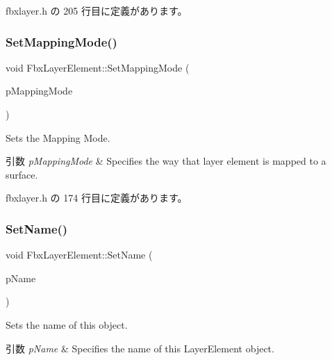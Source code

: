  fbxlayer.\+h の 205 行目に定義があります。

\mbox{\label{class_fbx_layer_element_af6918a0a87c5df4d257198d3c6a12ee2}} 
\subsubsection{\texorpdfstring{Set\+Mapping\+Mode()}{SetMappingMode()}}
{\footnotesize\ttfamily void Fbx\+Layer\+Element\+::\+Set\+Mapping\+Mode (\begin{DoxyParamCaption}\item[{\hyperlink{class_fbx_layer_element_a5a40e95db30ae9f94611dc3f1568af26}{E\+Mapping\+Mode}}]{p\+Mapping\+Mode }\end{DoxyParamCaption})\hspace{0.3cm}{\ttfamily [inline]}}

Sets the Mapping Mode. 
\begin{DoxyParams}{引数}
{\em p\+Mapping\+Mode} & Specifies the way that layer element is mapped to a surface. \\
\hline
\end{DoxyParams}


 fbxlayer.\+h の 174 行目に定義があります。

\mbox{\label{class_fbx_layer_element_a6b7d11d4cc2732537377f9483bac4d52}} 
\subsubsection{\texorpdfstring{Set\+Name()}{SetName()}}
{\footnotesize\ttfamily void Fbx\+Layer\+Element\+::\+Set\+Name (\begin{DoxyParamCaption}\item[{const char $\ast$}]{p\+Name }\end{DoxyParamCaption})\hspace{0.3cm}{\ttfamily [inline]}}

Sets the name of this object. 
\begin{DoxyParams}{引数}
{\em p\+Name} & Specifies the name of this Layer\+Element object. \\
\hline
\end{DoxyParams}


